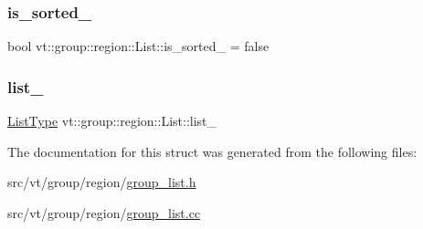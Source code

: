 \subsubsection{\texorpdfstring{is\+\_\+sorted\+\_\+}{is\_sorted\_}}
{\footnotesize\ttfamily bool vt\+::group\+::region\+::\+List\+::is\+\_\+sorted\+\_\+ = false\hspace{0.3cm}{\ttfamily [private]}}

\mbox{\label{structvt_1_1group_1_1region_1_1_list_a572bda4d9766fc8eb0c5eaca48f7b416}} 
\subsubsection{\texorpdfstring{list\+\_\+}{list\_}}
{\footnotesize\ttfamily \hyperlink{structvt_1_1group_1_1region_1_1_region_a4e35b2fc6dca06aca0b7bc0e19b35c5a}{List\+Type} vt\+::group\+::region\+::\+List\+::list\+\_\+\hspace{0.3cm}{\ttfamily [private]}}



The documentation for this struct was generated from the following files\+:\begin{DoxyCompactItemize}
\item 
src/vt/group/region/\hyperlink{group__list_8h}{group\+\_\+list.\+h}\item 
src/vt/group/region/\hyperlink{group__list_8cc}{group\+\_\+list.\+cc}\end{DoxyCompactItemize}
